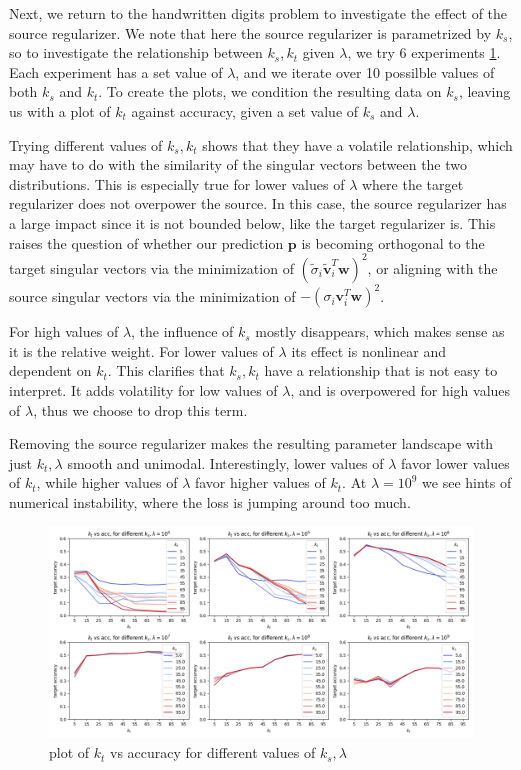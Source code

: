 \documentclass[twoside,11pt]{article}
\begin{document}
Next, we return to the handwritten digits problem to investigate the effect of the source regularizer. We note that here the source regularizer is parametrized by $k_s$, so to investigate the relationship between $k_s, k_t$ given $\lambda$, we try 6 experiments \ref{fig:ks_vs_kt}. Each experiment has a set value of $\lambda$, and we iterate over 10 possilble values of both $k_s$ and $k_t$. To create the plots, we condition the resulting data on $k_s$, leaving us with a plot of $k_t$ against accuracy, given a set value of $k_s$ and $\lambda$. 

Trying different values of $k_s, k_t$ shows that they have a volatile relationship, which may have to do with the similarity of the singular vectors between the two distributions. This is especially true for lower values of $\lambda$ where the target regularizer does not overpower the source. In this case, the source regularizer has a large impact since it is not bounded below, like the target regularizer is. This raises the question of whether our prediction $\mathbf{p}$ is becoming orthogonal to the target singular vectors via the minimization of $(\tilde{\sigma}_i \mathbf{\tilde{v}}_i^T \mathbf{w})^2$, or aligning with the source singular vectors via the minimization of $-(\sigma_i \mathbf{v}_i^T \mathbf{w})^2$.

For high values of $\lambda$, the influence of $k_s$ mostly disappears, which makes sense as it is the relative weight. For lower values of $\lambda$ its effect is nonlinear and dependent on $k_t$. This clarifies that $k_s, k_t$ have a relationship that is not easy to interpret. It adds volatility for low values of $\lambda$, and is overpowered for high values of $\lambda$, thus we choose to drop this term. 

Removing the source regularizer makes the resulting parameter landscape with just $k_t, \lambda$ smooth and unimodal. Interestingly, lower values of $\lambda$ favor lower values of $k_t$, while higher values of $\lambda$ favor higher values of $k_t$. At $\lambda = 10^9$ we see hints of numerical instability, where the loss is jumping around too much. 

\begin{figure}[htbp]
  \centering
  \includegraphics[width=1.0\textwidth]{img/k1_vs_k2.png}
  \caption{plot of $k_t$ vs accuracy for different values of $k_s, \lambda$}
  \label{fig:ks_vs_kt}
\end{figure}
\end{document}
